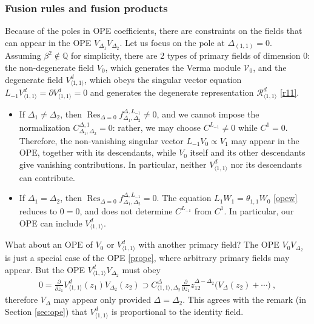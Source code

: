 \documentclass[12pt, a4paper]{article}
\begin{document}
\subsubsection{Fusion rules and fusion products}\label{sec:dope}

Because of the poles in OPE coefficients, there are constraints on the fields that can appear in the OPE $V_{\Delta_1}V_{\Delta_2}$. Let us focus on the pole at $\Delta_{(1,1)}=0$. Assuming $\beta^2\notin \mathbb{Q}$ for simplicity, there are 2 types of primary fields of dimension $0$: the non-degenerate field $V_0$, which generates the Verma module $\mathcal{V}_0$, and the degenerate field $V^d_{\langle 1,1\rangle}$, which obeys the singular vector equation $L_{-1}V^d_{\langle 1,1\rangle}=\partial V^d_{\langle 1,1\rangle}=0$ and generates the degenerate representation $\mathcal{R}^d_{\langle 1,1\rangle}$ \eqref{r11}.
\begin{itemize}
 \item If $\Delta_1\neq \Delta_2$, then $\operatorname{Res}_{\Delta=0}f^{\Delta,L_{-1}}_{\Delta_1,\Delta_2}\neq 0$, and we cannot impose the normalization $C^{\Delta,1}_{\Delta_1,\Delta_2}=0$: rather, we may choose $C^{L_{-1}}\neq 0$ while $C^1=0$. Therefore, the non-vanishing singular vector $L_{-1}V_0\propto V_1$ may appear in the OPE, together with its descendants, while $V_0$ itself and its other descendants give vanishing contributions. In particular, neither $V^d_{\langle 1,1\rangle}$ nor its descendants can contribute.
 \item If $\Delta_1=\Delta_2$, then $\operatorname{Res}_{\Delta=0}f^{\Delta,L_{-1}}_{\Delta_1,\Delta_2}= 0$. The equation $L_1W_1=\theta_{1,1}W_0$ \eqref{opew} reduces to $0=0$, and does not determine $C^{L_{-1}}$ from $C^1$. In particular, our OPE can include $V^d_{\langle 1,1\rangle}$.
\end{itemize}
What about an OPE of $V_0$ or $V^d_{\langle 1,1\rangle}$ with another primary field? The OPE $V_0V_{\Delta_2}$ is just a special case of the OPE \eqref{prope}, where arbitrary primary fields may appear.
But the OPE $V^d_{\langle 1,1\rangle}V_{\Delta_2}$ must obey 
\begin{align}
 0 = \frac{\partial}{\partial z_1} V^d_{\langle 1,1\rangle}(z_1)V_{\Delta_2}(z_2) \supset C_{\langle 1,1\rangle,\Delta_2}^{\Delta} \frac{\partial}{\partial z_1} z_{12}^{\Delta-\Delta_2} \big(V_\Delta(z_2) +\cdots \big) \ ,
\end{align}
therefore $V_\Delta$ may appear only provided $\Delta=\Delta_2$. This agrees with the remark (in Section \ref{sec:ope}) that $V^d_{\langle 1,1\rangle}$ is proportional to the identity field. 
\end{document}
